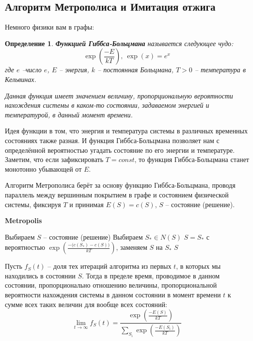 \documentclass[a4paper,12pt]{article}
\newtheorem{definition}{Определение}
\begin{document}
\subsection{Алгоритм Метрополиса и Имитация отжига}
Немного физики вам в графы:
\begin{definition}
    \textbf{Функцией Гиббса-Больцмана} называется следующее чудо:
    \[\exp\left(\displaystyle\frac{-E}{kT}\right),\ \exp(x) = e^x\] где $e$ --число $e$, $E$ -- энергия, $k$ -- постоянная Больцмана, $T > 0$ -- температура в Кельвинах.
    
    Данная функция имеет значением величину, пропорциональную вероятности нахождения системы в каком-то состоянии, задаваемом энергией и температурой, в данный момент времени.
\end{definition}
Идея функции в том, что энергия и температура системы в различных временных состояниях также разная. И функция Гиббса-Больцмана позволяет нам с определённой вероятностью угадать состояние по его энергии и температуре. Заметим, что если зафиксировать $T = const$, то функция Гиббса-Больцмана станет монотонно убывающей от $E$.

Алгоритм Метрополиса берёт за основу функцию Гиббса-Больцмана, проводя параллель между вершинным покрытием в графе и состоянием физической системы, фиксируя $T$ и принимая $E(S) = c(S)$, $S$ -- состояние (решение).
\begin{algorithm}[H]
        \caption{\textbf{Metropolis}}
    \begin{algorithmic}[1]
        \Statex
        \State Выбираем $S$ -- состояние (решение)
            \State Выбираем $S_* \in N(S)$
                \State $S = S_*$
            \Else
                \State с вероятностью $\exp\left(\displaystyle\frac{-\big(c(S_*) - c(S)\big)}{kT}\right)$, заменяем $S$ на $S_*$
            \EndIf
        \EndWhile
        \State\Return$S$
    \end{algorithmic}
\end{algorithm}
Пусть $f_S(t)$ -- доля тех итераций алгоритма из первых $t$, в которых мы находились в состоянии $S$. Тогда в пределе время, проводимое в данном состоянии, пропорционально отношению величины, пропорциональной вероятности нахождения системы в данном состоянии в момент времени $t$ к сумме всех таких величин для вообще всех состояний:
\[\lim\limits_{t \to \infty} f_S(t) = \displaystyle\frac{\exp\left(\displaystyle\frac{-E(S)}{kT}\right)}{\displaystyle\sum\limits_{S_i}\exp\left(\displaystyle\frac{-E(S_i)}{kT}\right)}\]
\end{document}
